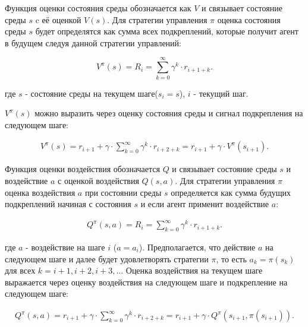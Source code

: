 Функция оценки состояния среды обозначается как $ V $ и связывает состояние среды $ s $ c её оценкой $ V(s) $. Для стратегии управления $ \pi $ оценка состояния среды $ s $ будет определятся как сумма всех подкреплений, которые получит агент в будущем следуя данной стратегии управлений:
 
$$ V^\pi(s)=R_i=\sum \limits_{k=0}^{\infty}\gamma^k \cdot r_{i+1+k}. $$

\noindent где $ s $ - состояние среды на текущем шаге($ s_i=s $), $ i $ - текущий шаг. 

$ V^\pi(s) $ можно выразить через оценку состояния среды и сигнал подкрепления на следующем шаге:

\begin{equation}
\label{eq:1_2p1}
\begin{alignedat}{2}
V^\pi(s)=r_{i+1} + \gamma\cdot\sum\limits_{k=0}^{\infty}\gamma^k \cdot r_{i+2+k}=r_{i+1} + \gamma \cdot V^\pi(s_{i+1}).
\end{alignedat}
\end{equation}

Функция оценки воздействия обозначается $ Q $ и связывает состояние среды $ s $ и воздействие $ a $ с оценкой воздействия $ Q(s,a) $. Для стратегии управления $ \pi $ оценка воздействия $ a $ при состоянии среды $ s $ определяется как сумма будущих подкреплений начиная с состояния $ s $ и если агент применит воздействие $ a $:

\begin{equation}
\label{eq:1_2p2}
\begin{alignedat}{2}
Q^\pi (s,a) = R_i = \sum\limits_{k=0}^{\infty}\gamma^k \cdot r_{i+1+k}.
\end{alignedat}
\end{equation}

\noindent где $ a $ - воздействие на шаге $ i $ ($ a=a_i $). Предполагается, что действие $ a $ на следующем шаге и далее будет удовлетворять стратегии $ \pi $, то есть $ a_k=\pi(s_k) $ для всех $ k=i+1, i+2, i+3, ... $ Оценка воздействия на текущем шаге выражается через оценку воздействия на следующем шаге и подкрепление на следующем шаге:

\begin{equation}
\label{eq:1_2p3}
\begin{alignedat}{2}
Q^\pi (s,a) = r_{i+1} + \gamma\cdot\sum\limits_{k=0}^{\infty}\gamma^k \cdot r_{i+2+k}=r_{i+1} + \gamma \cdot Q^\pi(s_{i+1}, \pi(s_{i+1})).
\end{alignedat}
\end{equation}

